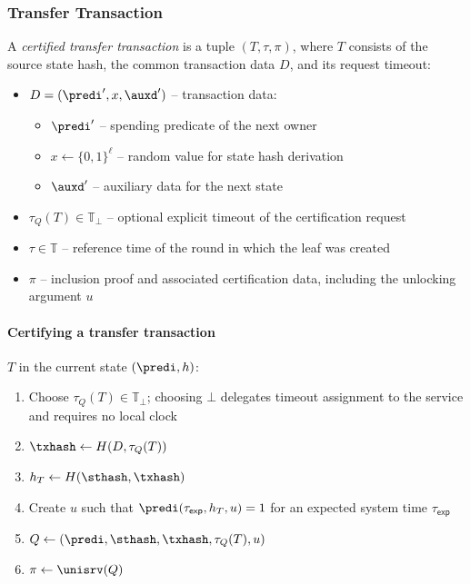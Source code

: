 \subsubsection{Transfer Transaction}\label{sec:transfer-tx}

A \emph{certified transfer transaction} is a tuple $(T, \tau, \pi)$, where $T$ consists of the source state hash, the common transaction data $D$, and its request timeout:
\begin{itemize}
	\item $D = (\predi', x, \auxd')$ -- transaction data:
	\begin{itemize}
		\item $\predi'$ -- spending predicate of the next owner
		\item $x \gets \{0,1\}^\ell$ -- random value for state hash derivation
		\item $\auxd'$ -- auxiliary data for the next state
	\end{itemize}
	\item $\tau_Q(T)\in\mathbb{T}_\bot$ -- optional explicit timeout of the certification request
	\item $\tau\in\mathbb T$ -- reference time of the round in which the leaf was created
	\item $\pi$ -- inclusion proof and associated certification data, including the unlocking argument $u$
\end{itemize}

\paragraph{Certifying a transfer transaction} $T$ in the current state $(\predi, h)$:
\begin{enumerate}
	\item Choose $\tau_Q(T)\in\mathbb{T}_\bot$; choosing $\bot$ delegates timeout assignment to the service and requires no local clock
	\item $\txhash \gets H(D, \tau_Q(T))$
	\item $h_T \gets H(\sthash, \txhash)$
	\item Create $u$ such that $\predi(\tau_\mathsf{exp}, h_T, u) = 1$ for an expected system time $\tau_\mathsf{exp}$
	\item $Q \gets (\predi, \sthash, \txhash, \tau_Q(T), u)$
	\item $\pi \gets \unisrv(Q)$
\end{enumerate}

